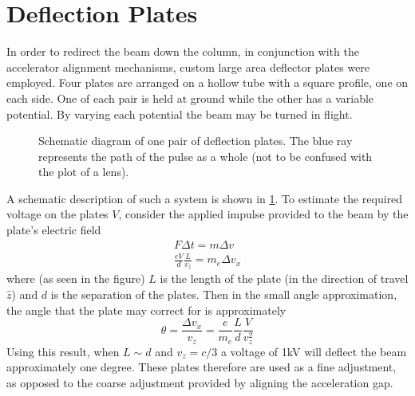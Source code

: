 
\section{Deflection Plates}

In order to redirect the beam down the column, in conjunction with the accelerator alignment mechanisms, custom large area deflector plates were employed.
Four plates are arranged on a hollow tube with a square profile, one on each side.
One of each pair is held at ground while the other has a variable potential.
By varying each potential the beam may be turned in flight.

\begin{figure}
  \centering
  
  \caption[Schematic diagram of one pair of deflection plates]{
    Schematic diagram of one pair of deflection plates.
    The blue ray represents the path of the pulse as a whole (not to be confused with the plot of a lens).
  }
  \label{fig:deflector_schematic}
\end{figure}

A schematic description of such a system is shown in \ref{fig:deflector_schematic}.
To estimate the required voltage on the plates $V$, consider the applied impulse provided to the beam by the plate's electric field
\begin{gather}
  F \Delta t = m \Delta v \\
  \frac{ e V }{ d } \frac{ L }{ v_z } = m_e \Delta v_x
\end{gather}
where (as seen in the figure) $L$ is the length of the plate (in the direction of travel $\hat{z}$) and $d$ is the separation of the plates.
Then in the small angle approximation, the angle that the plate may correct for is approximately
\begin{equation}
  \theta = \frac{ \Delta v_x }{ v_z } = \frac{ e }{ m_e } \frac{ L }{ d } \frac{ V }{ v_z^2 }
\end{equation}
Using this result, when $L \sim d$ and $v_z = c/3$ a voltage of 1kV will deflect the beam approximately one degree.
These plates therefore are used as a fine adjustment, as opposed to the coarse adjustment provided by aligning the acceleration gap.

